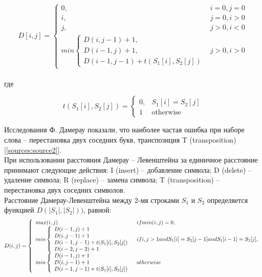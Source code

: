 \documentclass[a4paper,12pt]{article}
\begin{document}
\begin{equation}
\label{equations:equation1}
D[i,j] = \left\{
\begin{array}{ll}
0, & i = 0, j = 0 \\
i, & j = 0, i > 0 \\
j, & j > 0, i < 0 \\
min\left\{
\begin{array}{ll}
D(i,j - 1) + 1, \\
D(i - 1,j) + 1, \\
D(i - 1,j - 1) + t(S_1[i],S_2[j])
\end{array}
\right.
& j > 0, i > 0
\end{array}
\right.
\end{equation}
\\
где

\begin{equation}
t(S_1[i],S_2[j]) = \left\{
\begin{array}{ll}
0, & S_1[i] = S_2[j] \\
1 & \text{otherwise}
\end{array}
\right.
\end{equation}

Исследования Ф. Дамерау показали, что наиболее частая ошибка при наборе слова – перестановка двух соседних букв, транспозиция T (transposition)[\ref{sources:source2}]. \\
При использовании расстояния Дамерау   –   Левенштейна за единичное расстояние принимают следующие действия: I (insert) – добавление символа;  D  (delete) – удаление символа;  R  (replace) – замена символа;  T  (transposition) – перестановка двух соседних символов.  \\

Расстояние Дамерау-Левенштейна между 2-мя строками $S_1$ и $S_2$ определяется функцией $D(|S_1|,|S_2|))$, равной:
\begin{equation}
\label{equations:equation3}
D(i,j) = \left\{
\begin{array}{ll}
max(i,j) & if min(i,j) = 0, \\
min\left\{
\begin{array}{l}
D(i-1,j)+1\\
D(i,j-1)+1\\
D(i-1,j-1) + t(S_1[i],S_2[j])\\
D(i-2,j-2) + 1\\
\end{array}
\right. & if i,j>1 and S_1[i]=S_2[j-1] \linebreak and S_1[i-1]=S_2[j], \\
min\left\{
\begin{array}{l}
D(i-1,j)+1\\
D(i,j-1)+1\\
D(i-1,j-1) + t(S_1[i],S_2[j])\\
\end{array}
\right. & otherwise \\
\end{array}
\right.
\end{equation}
\end{document}
